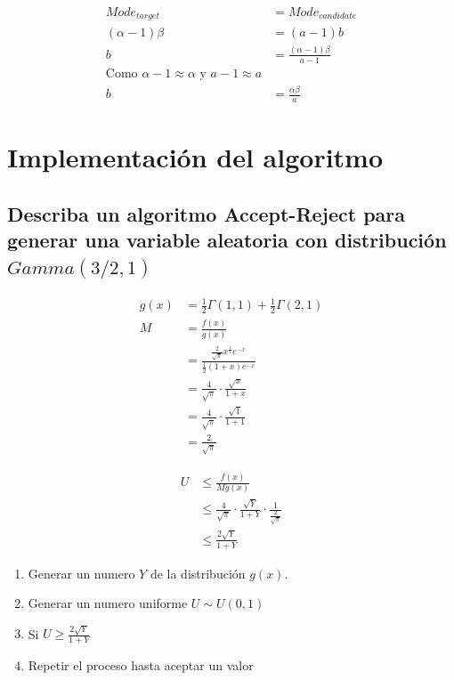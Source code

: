 \documentclass{article}
\begin{document}
\[
	\begin{split}
		Mode_{target}     & = Mode_{candidate}                    \\
		(\alpha - 1)\beta & = (a - 1)b                            \\
		b                 & = \frac{(\alpha - 1)\beta}{a-1}       \\
		\text{Como $\alpha -1 \approx \alpha $ y $a-1 \approx a$} \\
		b                 & = \frac{\alpha \beta}{a}
	\end{split}
\]

\section{Implementación del algoritmo}

\subsection{Describa un algoritmo \textbf{Accept-Reject} para generar una variable aleatoria con distribución $Gamma(3/2,1)$}

\[
	\begin{split}
		g(x) & = \frac{1}{2}\Gamma(1,1) + \frac{1}{2} \Gamma(2, 1)                           \\
		M    & = \frac{f(x)}{g(x)}                                                           \\
		     & = \frac{\frac{2}{\sqrt{\pi}} x^{\frac{1}{2}} e^{-x}}{\frac{1}{2} (1+x)e^{-x}} \\
		     & = \frac{4}{\sqrt{\pi}} \cdot \frac{\sqrt{x}}{1+x}                             \\
		     & = \frac{4}{\sqrt{\pi}} \cdot \frac{\sqrt{1}}{1+1}                             \\
		     & = \frac{2}{\sqrt{\pi}}
	\end{split}
\]


\[
	\begin{split}
		U & \le \frac{f(x)}{Mg(x)}                                                                   \\
		  & \le \frac{4}{\sqrt{\pi}} \cdot \frac{\sqrt{Y}}{1+Y} \cdot \frac{1}{\frac{2}{\sqrt{\pi}}} \\
		  & \le \frac{2\sqrt{Y}}{1 + Y}
	\end{split}
\]

\begin{enumerate}
	\item Generar un numero $Y$ de la distribución $g(x)$.
	\item Generar un numero uniforme $U \sim U(0,1)$
	\item Si $U \ge \frac{2\sqrt{Y}}{1 + Y}$
	\item Repetir el proceso hasta aceptar un valor
\end{enumerate}
\end{document}
